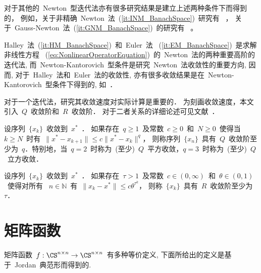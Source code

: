 对于其他的~Newton~型迭代法亦有很多研究结果是建立上述两种条件下而得到的，
例如，关于非精确~Newton~法~(\ref{it:INM_BanachSpace})~研究有~
\cite{ChenLi2006,Guo2007,LiShen2008,ShenLi2009,ShenLi2010,Ferreira2011c}，
关于~Gauss-Newton~法~(\ref{it:GNM_BanachSpace})~的研究有~
\cite{DedieuShub2000,DedieuKim2002,Chen2008,LiHuWang2010,Ferreira2011b,XuLi2008}。







Halley~法~(\ref{it:HM_BanachSpace})~和~Euler~法
~(\ref{it:EM_BanachSpace})~是求解非线性方程
~(\ref{eq:NonlinearOperatorEquation})~的~Newton~法的两种重要高阶的迭代法,
而~Newton-Kantorovich~型条件是研究~Newton~法收敛性的重要方向, 因而,
对于~Halley~法和~Euler~法的收敛性,
亦有很多收敛结果是在~Newton-Kantorovich~型条件下得到的,
如~\cite{Candela1990a,Candela1990b,Ezquerro2005,Gutierrez1997b,YeLi2006,YeLiShen2007}．





对于一个迭代法，研究其收敛速度对实际计算是重要的．
为刻画收敛速度，本文引入~$Q$~收敛阶和~$R$~收敛阶．
对于二者关系的详细论述可见文献~\cite{Potra1989,Jay2001,Ortega1970,Rheinboldt1998}．

\begin{definition}[$Q$~收敛阶]
\label{def:Q-orderConv} 设序列~$\{x_k\}$~收敛到~$x^*$~． 如果存在~$q
\geqslant 1$~及常数~$c \geqslant 0$~和~$N \geqslant 0$~使得当~$k
\geqslant N$~时有~$ \|x^* - x_{k+1}\| \leqslant c\|x^* - x_k\|^q$，
则称序列~$\{x_n\}$~具有~$Q$~收敛阶至少为~$q$．特别地，当~$q =
2$~时称为~(至少)~$Q$~平方收敛，$q = 3$~时称为~(至少)~$Q$~立方收敛．
\end{definition}

\begin{definition}[$R$~收敛阶]
\label{def:R-orderConv} 设序列~$\{x_k\}$~收敛到~$x^*$~．
如果存在~$\tau > 1$~及常数~$c \in (0,\infty)$~和~$\theta \in
(0,1)$~使得对所有 ~$n \in \mathbb{N}$~有~$\|x_k - x^*\| \leqslant c
\theta^{\tau^k}$， 则称~$\{x_k\}$~具有~$R$~收敛阶至少为~$\tau$．
\end{definition}







\section{矩阵函数}

矩阵函数~$f:\CS^{n\times n} \to \CS^{n\times n}$~有多种等价定义,
下面所给出的定义是基于~Jordan~典范形而得到的.

